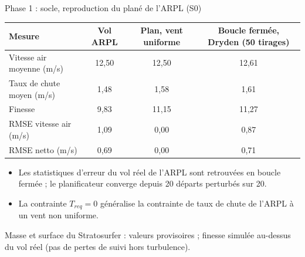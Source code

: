 \documentclass[aspectratio=169,10pt]{beamer}
\newcommand{\fine}[1]{{\color{muted}\scriptsize #1}}
\begin{document}
\begin{frame}{Phase 1 : socle, reproduction du plané de l'ARPL (S0)}
  \centering\small
  \begin{tabular}{@{}lccc@{}}
    \toprule
    Mesure & Vol ARPL & Plan, vent uniforme & Boucle fermée, Dryden (50 tirages) \\ \midrule
    Vitesse air moyenne (m/s) & 12{,}50 & 12{,}50 & 12{,}61 \\
    Taux de chute moyen (m/s) & 1{,}48 & 1{,}58 & 1{,}61 \\
    Finesse & 9{,}83 & 11{,}15 & 11{,}27 \\
    RMSE vitesse air (m/s) & 1{,}09 & 0{,}00 & 0{,}87 \\
    RMSE netto (m/s) & 0{,}69 & 0{,}00 & 0{,}71 \\
    \bottomrule
  \end{tabular}\par\medskip
  \begin{itemize}\small
    \item Les statistiques d'erreur du vol réel de l'ARPL sont retrouvées en boucle fermée ; le planificateur converge depuis 20 départs perturbés sur 20.
    \item La contrainte $T_{req}=0$ généralise la contrainte de taux de chute de l'ARPL à un vent non uniforme.
  \end{itemize}
  \fine{Masse et surface du Stratosurfer : valeurs provisoires ; finesse simulée au-dessus du vol réel (pas de pertes de suivi hors turbulence).}
\end{frame}
\end{document}
